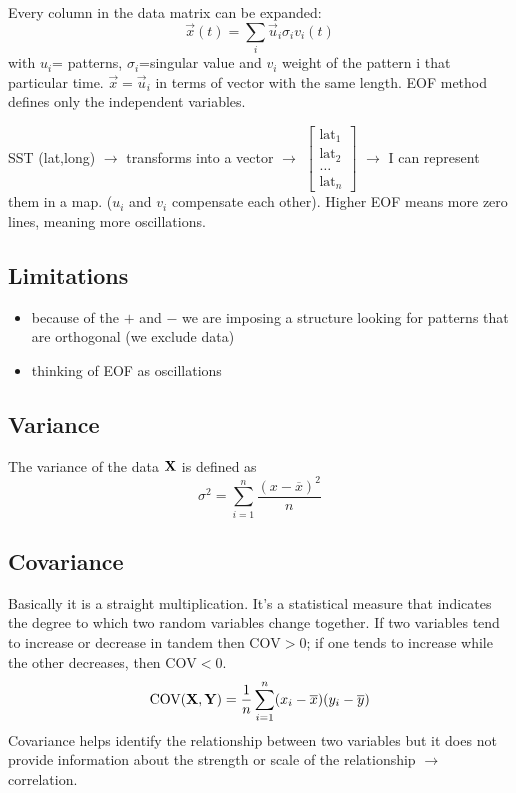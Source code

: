 Every column in the data matrix can be expanded:
\begin{equation*}
	\vec{x}(t)=\sum_i \vec{u}_i \sigma_i v_i(t)
\end{equation*}
with $u_i$= patterns, $\sigma_i$=singular value and $v_i$ weight of the pattern i that particular time. $\vec{x}=\vec{u}_i$ in terms of vector with the same length. EOF method defines only the independent variables.

SST (lat,long) $\rightarrow$ transforms into a vector $\rightarrow$ $\begin{bmatrix}
		\text{lat}_1 \\
		\text{lat}_2 \\
		\dots        \\
		\text{lat}_n
	\end{bmatrix}$ $\rightarrow$ I can represent them in a map.
($u_i$ and $v_i$ compensate each other).
Higher EOF means more zero lines, meaning more oscillations.

\subsection{Limitations}\label{subsec:eof-limitations}
\begin{itemize}
	\item because of the $+$ and $-$ we are imposing a structure looking for patterns that are orthogonal (we exclude data)
	\item thinking of EOF as oscillations
\end{itemize}

\subsection{Variance}\label{subsec:variance}
The variance of the data $\mathbf{X}$ is defined as
\begin{equation}
	\sigma^2 = \displaystyle\sum_{i=1}^n\frac{(x-\overline{x})^2}{n}
	\label{eq:variance-def}
\end{equation}

\subsection{Covariance}\label{subsec:covariance}
Basically it is a straight multiplication.
It's a statistical measure that indicates the degree to which two random variables change together. If two variables tend to increase or decrease in tandem then $\text{COV}>0$; if one tends to increase while the other decreases, then $\text{COV}<0$.
\begin{equation}
	\text{COV}(\mathbf{X},\mathbf{Y}) = \frac{1}{n}\sum_{i=1}^n(x_i-\overline{x})(y_i-\overline{y})
	\label{eq:covariance-def}
\end{equation}
Covariance helps identify the relationship between two variables but it does not provide information about the strength or scale of the relationship $\rightarrow$ correlation.

